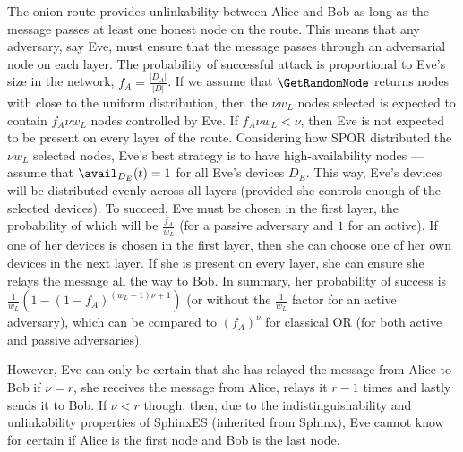 The onion route provides unlinkability between Alice and Bob as long as the 
message passes at least one honest node on the route.
This means that any adversary, say Eve,  must ensure that the message passes 
through an adversarial node on each layer.
The probability of successful attack is proportional to Eve's size in the 
network, \ie \(f_A = \frac{|D_A|}{|D|}\).
If we assume that \(\GetRandomNode\) returns nodes with close to the uniform 
distribution, then the \(\nu w_L\) nodes selected is expected to contain \(f_A 
  \nu w_L\) nodes controlled by Eve.
If \(f_A \nu w_L < \nu\), then Eve is not expected to be present on every layer 
of the route.
Considering how \ac{SPOR} distributed the \(\nu w_L\) selected nodes, Eve's 
best strategy is to have high-availability nodes --- assume that 
\(\avail_{D_E}(t) = 1\) for all Eve's devices \(D_E\).
This way, Eve's devices will be distributed evenly across all layers (provided 
she controls enough of the selected devices).
To succeed, Eve must be chosen in the first layer, the probability of which 
will be \(\frac{f_A}{w_L}\) (for a passive adversary and \(1\) for an active).
If one of her devices is chosen in the first layer, then she can choose one of 
her own devices in the next layer.
If she is present on every layer, she can ensure she relays the message all the 
way to Bob.
In summary, her probability of success is \(\frac{1}{w_L} (1-(1-f_A)^{(w_L-1) 
    \nu +1})\) (or without the \(\frac{1}{w_L}\) factor for an active 
adversary), which can be compared to \((f_A)^\nu\) for classical \ac{OR} (for 
both active and passive adversaries).

However, Eve can only be certain that she has relayed the message from Alice to 
Bob if \(\nu = r\), \ie she receives the message from Alice, relays it \(r-1\) 
times and lastly sends it to Bob.
If \(\nu < r\) though, then, due to the indistinguishability and unlinkability 
properties of SphinxES (inherited from \ac{Sphinx}), Eve cannot know for certain if 
Alice is the first node and Bob is the last node. 


